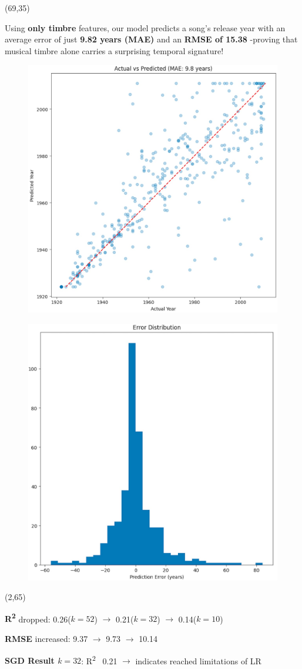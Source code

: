 \documentclass{beamer}
\begin{document}
\begin{frame}
\begin{textblock}{28.5}(69,35)
	\begin{basebox}[
        decadebox,
        title=Year Prediction,
        halign title=right
    ]
		Using \textbf{only timbre} features, our model predicts a song's release year with an average error of just \textbf{9.82 years (MAE)} and an \textbf{RMSE of 15.38} -proving that musical timbre alone carries a surprising temporal signature! 
        \begin{figure}
            \centering
            \includegraphics[width=0.5\linewidth]{img/Linear.jpg}
        \end{figure}
        \begin{figure}
            \centering
            \includegraphics[width=0.5\linewidth]{img/error.jpg}
        \end{figure}
        
	\end{basebox}
\end{textblock}

\begin{textblock}{28.5}(2,65)
	\begin{basebox}[
        decadebox,
        title=Results of Linear Regression with different Principal Components ($k$),
        halign title=right
    ]
    \item \textbf{R\textsuperscript{2}} dropped: 0.26($k=52$) $\rightarrow$ 0.21($k=32$) $\rightarrow$ 0.14($k=10$) \\
	\item \textbf{RMSE} increased: 9.37 $\rightarrow$ 9.73 $\rightarrow$ 10.14 \\
    \item \textbf{SGD Result $k=32$}: R\textsuperscript{2} ~0.21 $\rightarrow$ indicates reached limitations of LR
	\end{basebox}
\end{textblock}


\end{frame}
\end{document}
